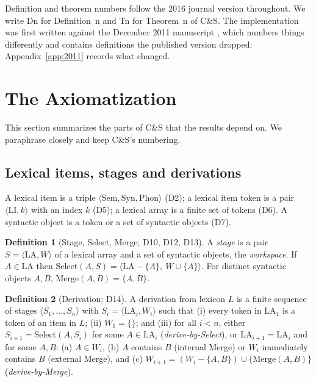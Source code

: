\documentclass[11pt]{article}
\newcommand{\Def}[1]{D#1}
\newcommand{\Thm}[1]{T#1}
\newcommand{\LA}{\mathrm{LA}}
\newcommand{\Merge}{\mathrm{Merge}}
\newcommand{\Select}{\mathrm{Select}}
\newcommand{\pair}[1]{\langle #1 \rangle}
\theoremstyle{definition}
\newtheorem{definition}{Definition}
\theoremstyle{plain}
\begin{document}
Definition and theorem numbers follow the 2016 journal version throughout. We
write \Def{n} for Definition~n and \Thm{n} for Theorem~n of C\&S. The
implementation was first written against the December 2011 manuscript
\citep{CollinsStabler2011}, which numbers things differently and contains
definitions the published version dropped; Appendix~\ref{app:2011} records
what changed.

\section{The Axiomatization}
\label{sec:background}

This section summarizes the parts of C\&S that the results depend on. We
paraphrase closely and keep C\&S's numbering.

\subsection{Lexical items, stages and derivations}

A lexical item is a triple $\pair{\mathrm{Sem},\mathrm{Syn},\mathrm{Phon}}$
(\Def{2}); a lexical item token is a pair $\pair{\mathrm{LI},k}$ with an
index $k$ (\Def{5}); a lexical array is a finite set of tokens (\Def{6}). A
syntactic object is a token or a set of syntactic objects (\Def{7}).

\begin{definition}[Stage, Select, Merge; \Def{10}, \Def{12}, \Def{13}]
A \emph{stage} is a pair $S = \pair{\LA, W}$ of a lexical array and a set of
syntactic objects, the \emph{workspace}. If $A \in \LA$ then
$\Select(A,S) = \pair{\LA - \{A\},\ W \cup \{A\}}$. For distinct syntactic
objects $A,B$, $\Merge(A,B) = \{A,B\}$.
\end{definition}

\begin{definition}[Derivation; \Def{14}]
A derivation from lexicon $L$ is a finite sequence of stages
$\pair{S_1,\dots,S_n}$ with $S_i = \pair{\LA_i, W_i}$ such that (i) every
token in $\LA_1$ is a token of an item in $L$; (ii) $W_1 = \{\}$; and (iii)
for all $i<n$, either $S_{i+1} = \Select(A, S_i)$ for some $A\in\LA_i$
(\emph{derive-by-Select}), or $\LA_{i+1} = \LA_i$ and for some $A,B$:
(a) $A \in W_i$, (b) $A$ contains $B$ (internal Merge) or $W_i$ immediately
contains $B$ (external Merge), and (c)
$W_{i+1} = (W_i - \{A,B\}) \cup \{\Merge(A,B)\}$ (\emph{derive-by-Merge}).
\end{definition}
\end{document}
